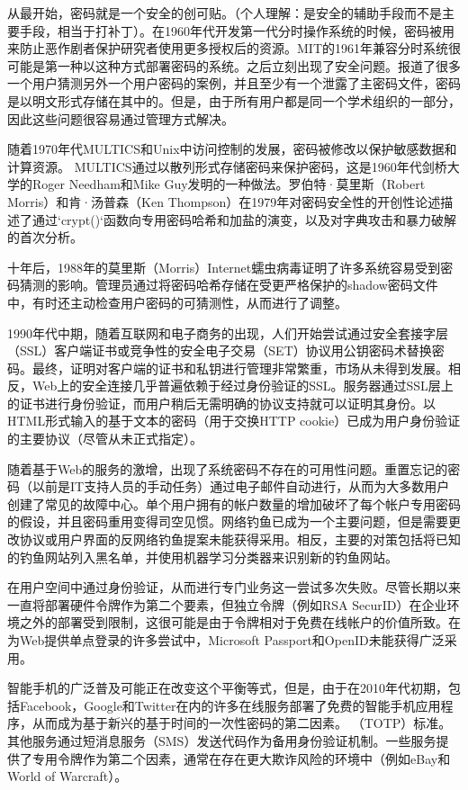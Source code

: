 从最开始，密码就是一个安全的创可贴。（个人理解：是安全的辅助手段而不是主要手段，相当于打补丁）。在1960年代开发第一代分时操作系统的时候，密码被用来防止恶作剧者保护研究者使用更多授权后的资源。MIT的1961年兼容分时系统很可能是第一种以这种方式部署密码的系统。之后立刻出现了安全问题。报道了很多一个用户猜测另外一个用户密码的案例，并且至少有一个泄露了主密码文件，密码是以明文形式存储在其中的。但是，由于所有用户都是同一个学术组织的一部分，因此这些问题很容易通过管理方式解决。

随着1970年代MULTICS和Unix中访问控制的发展，密码被修改以保护敏感数据和计算资源。 MULTICS通过以散列形式存储密码来保护密码，这是1960年代剑桥大学的Roger Needham和Mike Guy发明的一种做法。罗伯特·莫里斯（Robert Morris）和肯·汤普森（Ken Thompson）在1979年对密码安全性的开创性论述描述了通过`crypt()`函数向专用密码哈希和加盐的演变，以及对字典攻击和暴力破解的首次分析。

十年后，1988年的莫里斯（Morris）Internet蠕虫病毒证明了许多系统容易受到密码猜测的影响。管理员通过将密码哈希存储在受更严格保护的shadow密码文件中，有时还主动检查用户密码的可猜测性，从而进行了调整。

1990年代中期，随着互联网和电子商务的出现，人们开始尝试通过安全套接字层（SSL）客户端证书或竞争性的安全电子交易（SET）协议用公钥密码术替换密码。最终，证明对客户端的证书和私钥进行管理非常繁重，市场从未得到发展。相反，Web上的安全连接几乎普遍依赖于经过身份验证的SSL。服务器通过SSL层上的证书进行身份验证，而用户稍后无需明确的协议支持就可以证明其身份。以HTML形式输入的基于文本的密码（用于交换HTTP cookie）已成为用户身份验证的主要协议（尽管从未正式指定）。

随着基于Web的服务的激增，出现了系统密码不存在的可用性问题。重置忘记的密码（以前是IT支持人员的手动任务）通过电子邮件自动进行，从而为大多数用户创建了常见的故障中心。单个用户拥有的帐户数量的增加破坏了每个帐户专用密码的假设，并且密码重用变得司空见惯。网络钓鱼已成为一个主要问题，但是需要更改协议或用户界面的反网络钓鱼提案未能获得采用。相反，主要的对策包括将已知的钓鱼网站列入黑名单，并使用机器学习分类器来识别新的钓鱼网站。

在用户空间中通过身份验证，从而进行专门业务这一尝试多次失败。尽管长期以来一直将部署硬件令牌作为第二个要素，但独立令牌（例如RSA SecurID）在企业环境之外的部署受到限制，这很可能是由于令牌相对于免费在线帐户的价值所致。在为Web提供单点登录的许多尝试中，Microsoft Passport和OpenID未能获得广泛采用。

智能手机的广泛普及可能正在改变这个平衡等式，但是，由于在2010年代初期，包括Facebook，Google和Twitter在内的许多在线服务部署了免费的智能手机应用程序，从而成为基于新兴的基于时间的一次性密码的第二因素。 （TOTP）标准。其他服务通过短消息服务（SMS）发送代码作为备用身份验证机制。一些服务提供了专用令牌作为第二个因素，通常在存在更大欺诈风险的环境中（例如eBay和World of Warcraft）。

